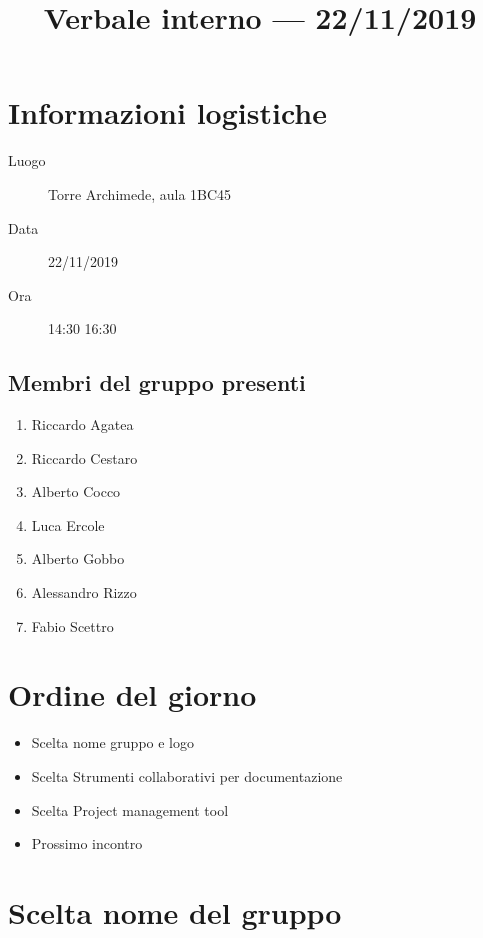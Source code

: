 \documentclass{article}
\title{Verbale interno --- 22/11/2019}
\begin{document}


\section{Informazioni logistiche}%
\label{sec:informazioni_logistiche}

\begin{description}
  \item [Luogo] Torre Archimede, aula 1BC45
  \item [Data] 22/11/2019
  \item [Ora] 14:30  16:30
\end{description}

\subsection{Membri del gruppo presenti}%
\label{sub:membri_del_gruppo_presenti}

\begin{enumerate}
  \item Riccardo Agatea
  \item Riccardo Cestaro
  \item Alberto Cocco
  \item Luca Ercole
  \item Alberto Gobbo
  \item Alessandro Rizzo
  \item Fabio Scettro
\end{enumerate}

\section{Ordine del giorno}%
\label{sec:ordine_del_giorno}

\begin{itemize}
  \item Scelta nome gruppo e logo
  \item Scelta Strumenti collaborativi per documentazione
  \item Scelta Project management tool
  \item Prossimo incontro
\end{itemize}

\section{Scelta nome del gruppo}%
\label{sec:scelta_nome_del_gruppo}
\end{document}

